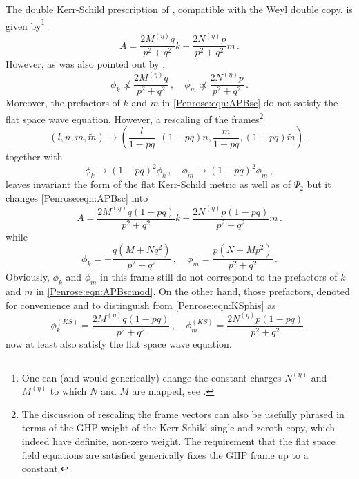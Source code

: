 The double Kerr-Schild prescription of \cite{Luna:2018dpt}, compatible with the Weyl double copy, is given by\footnote{One can (and would generically) change the constant charges $N^{(\eta)}$ and $M^{(\eta)}$ to which $N$ and $M$ are mapped, see \cite{Luna:2018dpt}.}
\begin{equation}\label{Penrose:eqn:APBsc}
A = \frac{2 M^{(\eta)} q}{p^2 + q^2}k +  \frac{2 N^{(\eta)} p}{p^2 + q^2} m \, .  
\end{equation}
However, as was also pointed out by \cite{Luna:2018dpt},
\begin{equation}
\phi_k \not\propto  \frac{2 M^{(\eta)} q}{p^2 + q^2} \, , \quad \phi_m \not\propto \frac{2 N^{(\eta)} p}{p^2 + q^2} \, .
\end{equation}
Moreover, the prefactors of $k$ and $m$ in \eqref{Penrose:eqn:APBsc} do not satisfy the flat space wave equation. However, a rescaling of the frames\footnote{The discussion of rescaling the frame vectors can also be usefully phrased in terms of the GHP-weight of the Kerr-Schild single and zeroth copy, which indeed have definite, non-zero weight. The requirement that the flat space field equations are satisfied generically fixes the GHP frame up to a constant.}
\begin{equation}
\left(l,n,m,\tilde{m}\right) \to  \left(\frac{l}{1-pq}, \left(1-pq \right)n,\frac{m}{1-pq}, \left(1-pq \right)\tilde{m}\right) \, ,
\end{equation}
together with
\begin{equation}\label{Penrose:eqn:phishifts}
\phi_k \to \left(1-pq\right)^2\phi_k \, , \quad  	\phi_m \to \left(1-pq\right)^2\phi_m \, , 
\end{equation}
leaves invariant the form of the flat Kerr-Schild metric as well as of $\Psi_2$ but it changes \eqref{Penrose:eqn:APBsc} into
\begin{equation}\label{Penrose:eqn:APBscmod}
A =  \frac{2 M^{(\eta)} q \left(1-pq\right)}{p^2 + q^2}k +  \frac{2 N^{(\eta)} p \left(1-pq\right)}{p^2 + q^2} m \, .  
\end{equation}
while
\begin{equation}\label{Penrose:eqn:KSphis}
\phi_k = - \frac{q (M+Nq^2)}{p^2+q^2}  \, , \quad \phi_m  = \frac{p (N+Mp^2)}{p^2+q^2} \, .
\end{equation}
Obviously, $\phi_k$ and $\phi_m$ in this frame still do not correspond to the prefactors of $k$ and $m$ in \eqref{Penrose:eqn:APBscmod}. On the other hand, those prefactors, denoted for convenience and to distinguish from \eqref{Penrose:eqn:KSphis} as
\begin{equation}\label{Penrose:eqn:KSphisKS}
\phi^{(KS)}_k = \frac{2 M^{(\eta)} q \left(1-pq\right)}{p^2 + q^2} \, , \quad \phi^{(KS)}_m  = \frac{2 N^{(\eta)} p \left(1-pq\right)}{p^2 + q^2} \, .
\end{equation}
now at least also satisfy the flat space wave equation.

